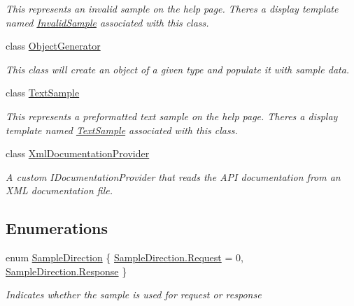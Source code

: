 \begin{DoxyCompactItemize}
\begin{DoxyCompactList}\small\item\em This represents an invalid sample on the help page. There\textquotesingle{}s a display template named \hyperlink{class_open_1_1_g_i_1_1hypermart_1_1_areas_1_1_help_page_1_1_invalid_sample}{Invalid\+Sample} associated with this class. \end{DoxyCompactList}\item 
class \hyperlink{class_open_1_1_g_i_1_1hypermart_1_1_areas_1_1_help_page_1_1_object_generator}{Object\+Generator}
\begin{DoxyCompactList}\small\item\em This class will create an object of a given type and populate it with sample data. \end{DoxyCompactList}\item 
class \hyperlink{class_open_1_1_g_i_1_1hypermart_1_1_areas_1_1_help_page_1_1_text_sample}{Text\+Sample}
\begin{DoxyCompactList}\small\item\em This represents a preformatted text sample on the help page. There\textquotesingle{}s a display template named \hyperlink{class_open_1_1_g_i_1_1hypermart_1_1_areas_1_1_help_page_1_1_text_sample}{Text\+Sample} associated with this class. \end{DoxyCompactList}\item 
class \hyperlink{class_open_1_1_g_i_1_1hypermart_1_1_areas_1_1_help_page_1_1_xml_documentation_provider}{Xml\+Documentation\+Provider}
\begin{DoxyCompactList}\small\item\em A custom I\+Documentation\+Provider that reads the A\+P\+I documentation from an X\+M\+L documentation file. \end{DoxyCompactList}\end{DoxyCompactItemize}
\subsection*{Enumerations}
\begin{DoxyCompactItemize}
\item 
enum \hyperlink{namespace_open_1_1_g_i_1_1hypermart_1_1_areas_1_1_help_page_a96790152101b7f9c7e4ff518bb45c822}{Sample\+Direction} \{ \hyperlink{namespace_open_1_1_g_i_1_1hypermart_1_1_areas_1_1_help_page_a96790152101b7f9c7e4ff518bb45c822a15c2d85f1fae22a3c3a0594510a1f611}{Sample\+Direction.\+Request} = 0, 
\hyperlink{namespace_open_1_1_g_i_1_1hypermart_1_1_areas_1_1_help_page_a96790152101b7f9c7e4ff518bb45c822ad64ed3e9c10229648e069f56e32f4c8e}{Sample\+Direction.\+Response}
 \}\begin{DoxyCompactList}\small\item\em Indicates whether the sample is used for request or response \end{DoxyCompactList}
\end{DoxyCompactItemize}


